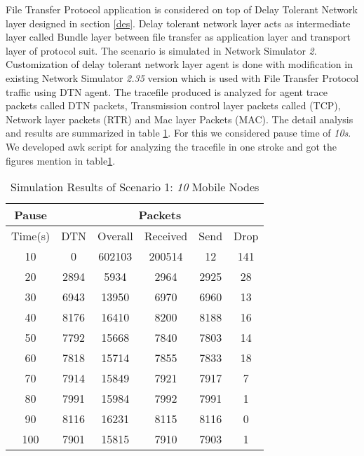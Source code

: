 \documentclass[3p,times]{elsarticle}
\begin{document}
File Transfer Protocol application is considered on top of Delay Tolerant Network layer designed in section \ref{des}. Delay tolerant network layer acts as intermediate layer called Bundle layer between file transfer as application layer and transport layer of protocol suit. The scenario is simulated in Network Simulator \emph{2}. Customization of delay tolerant network layer agent is done with modification in existing Network Simulator \emph{2.35} version which is used with File Transfer Protocol traffic using DTN agent.  The tracefile produced is analyzed for agent trace packets called DTN packets, Transmission control layer packets called (TCP), Network layer packets (RTR) and Mac layer Packets (MAC). The detail analysis and results are summarized in table \ref {t4}. For this we considered pause time of \emph{10s}. We developed awk script for analyzing the tracefile in one stroke and got the figures mention in table\ref{t4}.
\begin{table}[h]
\centering
\caption{Simulation Results of Scenario 1: \emph{10} Mobile Nodes}
\begin{tabular}{|c|c|c|c|c|c|}
\hline
Pause  & \multicolumn{5}{c|}{Packets} \\
\hline
Time(s) & DTN   & Overall & Received & Send & Drop \\
\hline
10 & 0 & 602103 & 200514 & 12 &  141 \\
20 & 2894 & 5934 & 2964 & 2925 & 28 \\
30 & 6943 & 13950 & 6970 & 6960 & 13 \\
40 & 8176 & 16410 & 8200 & 8188 & 16 \\
50 & 7792 & 15668 & 7840 & 7803 &  14 \\
60 & 7818 & 15714 & 7855 & 7833 &  18 \\
70 & 7914 & 15849 & 7921 & 7917 &  7 \\
80 & 7991 & 15984 & 7992 & 7991 &  1 \\
90 & 8116 & 16231 & 8115 & 8116 &  0 \\
100 & 7901 & 15815 & 7910 & 7903 &  1 \\
\hline
\end{tabular}
\label{t4}
\end{table}
\end{document}
